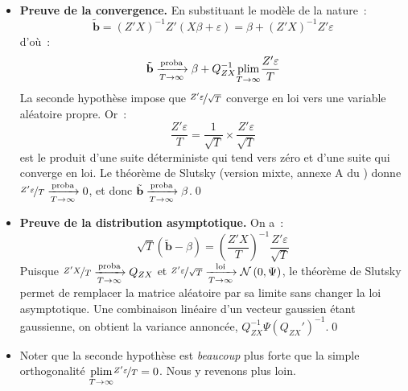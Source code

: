 \documentclass[10pt]{beamer}
\begin{document}
\begin{notes}

  \begin{itemize}

  \item \textbf{Preuve de la convergence.} En substituant le modèle de la
    nature~:
    \[
      \tilde{\mathbf b} = (Z'X)^{-1}Z'\left(X\beta + \varepsilon\right) = \beta + (Z'X)^{-1}Z'\varepsilon
    \]
    d'où~:
    \[
      \tilde{\mathbf b} \xrightarrow[T\rightarrow\infty]{\text{proba}} \beta + Q_{ZX}^{-1}\underset{T\rightarrow\infty}{\text{plim}} \frac{Z'\varepsilon}{T}
    \]
    La seconde hypothèse impose que $\nicefrac{Z'\varepsilon}{\sqrt T}$ converge
    en loi vers une variable aléatoire propre. Or~:
    \[
      \frac{Z'\varepsilon}{T} = \frac{1}{\sqrt T}\times\frac{Z'\varepsilon}{\sqrt T}
    \]
    est le produit d'une suite déterministe qui tend vers zéro et d'une suite qui
    converge en loi. Le théorème de Slutsky
    (version mixte, annexe A du ) donne
    $\nicefrac{Z'\varepsilon}{T}\xrightarrow[T\rightarrow\infty]{\text{proba}} 0$, et donc
    $\tilde{\mathbf b}\xrightarrow[T\rightarrow\infty]{\text{proba}}\beta$.\qed\newline

  \item \textbf{Preuve de la distribution asymptotique.} On a~:
    \[
      \sqrt{T}\left(\tilde{\mathbf b} - \beta\right) = \left(\frac{Z'X}{T}\right)^{-1} \frac{Z'\varepsilon}{\sqrt{T}}
    \]
    Puisque $\nicefrac{Z'X}{T}\xrightarrow[T\rightarrow\infty]{\text{proba}} Q_{ZX}$ et
    $\nicefrac{Z'\varepsilon}{\sqrt T}\xrightarrow[T\rightarrow\infty]{\text{loi}}\mathcal N\left(0,\Psi\right)$, le théorème de
    Slutsky permet de remplacer la matrice aléatoire par sa limite sans changer
    la loi asymptotique. Une combinaison linéaire d'un vecteur gaussien étant
    gaussienne, on obtient la variance annoncée,
    $Q_{ZX}^{-1}\Psi\left(Q_{ZX}'\right)^{-1}$.\qed\newline

  \item Noter que la seconde hypothèse est \emph{beaucoup} plus forte que la
    simple orthogonalité $\underset{T\rightarrow\infty}{\text{plim}}\nicefrac{Z'\varepsilon}{T}=0$.
    Nous y revenons plus loin.

  \end{itemize}

\end{notes}
\end{document}
